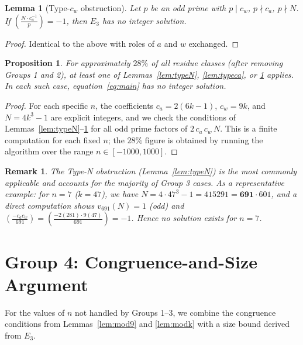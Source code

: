 \documentclass[12pt]{article}
\newtheorem{lemma}[theorem]{Lemma}
\newtheorem{proposition}[theorem]{Proposition}
\newtheorem*{remark}{Remark}
\newcommand{\leg}[2]{\left(\frac{#1}{#2}\right)}
\begin{document}
\begin{lemma}[Type-$c_w$ obstruction]\label{lem:typecw}
Let $p$ be an odd prime with $p \mid c_w$, $p \nmid c_a$, $p \nmid N$.
If $\leg{N\cdot c_a^{-1}}{p} = -1$, then $E_3$ has no integer solution.
\end{lemma}
\begin{proof}
Identical to the above with roles of $a$ and $w$ exchanged.
\end{proof}

\begin{proposition}\label{prop:group3}
For approximately $28\%$ of all residue classes (after removing Groups 1 and 2),
at least one of Lemmas~\ref{lem:typeN}, \ref{lem:typeca}, or \ref{lem:typecw} applies. 
In each such case, equation~\eqref{eq:main} has no integer solution.
\end{proposition}
\begin{proof}
For each specific $n$, the coefficients $c_a = 2(6k-1)$, $c_w = 9k$, and $N = 4k^3-1$ are explicit integers,
and we check the conditions of Lemmas~\ref{lem:typeN}--\ref{lem:typecw} for all odd prime factors 
of $2\,c_a\,c_w\,N$. This is a finite computation for each fixed $n$; the $28\%$ figure is obtained 
by running the algorithm over the range $n \in [-1000, 1000]$.
\end{proof}

\begin{remark}
The Type-N obstruction (Lemma~\ref{lem:typeN}) is the most commonly applicable and accounts 
for the majority of Group 3 cases. As a representative example: for $n = 7$ ($k = 47$), 
we have $N = 4 \cdot 47^3 - 1 = 415291 = \mathbf{691} \cdot 601$, and a direct computation shows 
$v_{691}(N) = 1$ (odd) and $\leg{-c_a c_w}{691} = \leg{-2(281)\cdot 9(47)}{691} = -1$.
Hence no solution exists for $n = 7$.
\end{remark}

\section{Group 4: Congruence-and-Size Argument}\label{sec:group4}

For the values of $n$ not handled by Groups 1--3, we combine the congruence conditions from  
Lemmas~\ref{lem:mod9} and \ref{lem:modk} with a size bound derived from $E_3$.
\end{document}
